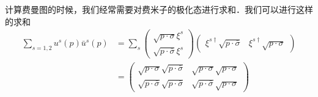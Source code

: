 
计算费曼图的时候，我们经常需要对费米子的极化态进行求和．我们可以进行这样的求和
\begin{align}\nonumber
\sum_{s = 1,2}u^s(p)\bar u^s(p ) & = \sum_s \begin{pmatrix}
\sqrt{p\cdot \sigma}\xi^s \\
\sqrt{p\cdot\bar\sigma} \xi^s
\end{pmatrix}\begin{pmatrix}
\xi^{s\dagger}\sqrt{p\cdot\bar\sigma} & \xi^{s\dagger}\sqrt{p\cdot \sigma}
\end{pmatrix}\\
& = \begin{pmatrix}
\sqrt{p\cdot\sigma}\sqrt{p\cdot \bar \sigma} & \sqrt{p\cdot \sigma}\sqrt{p\cdot\sigma} \\
\sqrt{p\cdot\bar\sigma} \sqrt{p\cdot \bar\sigma} & \sqrt{p\cdot\bar\sigma} \sqrt{p\cdot\sigma}
\end{pmatrix}
\end{align}